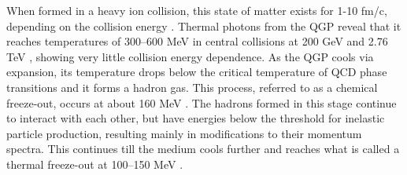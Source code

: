 When formed in a heavy ion collision, this state of matter exists for 1-10 fm/c, depending on the collision energy \cite{doi:10.1146/annurev.nucl.46.1.71}. Thermal photons from the QGP reveal that 
it reaches temperatures of 300--600 MeV in central collisions at 200 GeV \cite{PhysRevLett.104.132301} and 2.76 TeV \cite{2016235}, showing very little collision energy dependence. As the QGP 
cools via expansion, its temperature drops below the critical temperature of QCD phase transitions and it forms a hadron gas. This process, referred to as a chemical freeze-out, occurs at about
160 MeV \cite{Fodor_2004, ADAMS2005102, PhysRevC.93.024917}. The hadrons formed in this stage continue to interact with each other, but have energies below the threshold for inelastic 
particle production, resulting mainly in modifications to their momentum spectra. This continues till the medium cools further and reaches what is called a thermal freeze-out at 100--150 MeV \cite{PhysRevC.69.024904, PhysRevC.72.014908, PhysRevC.75.024910, PhysRevC.88.044910}.






